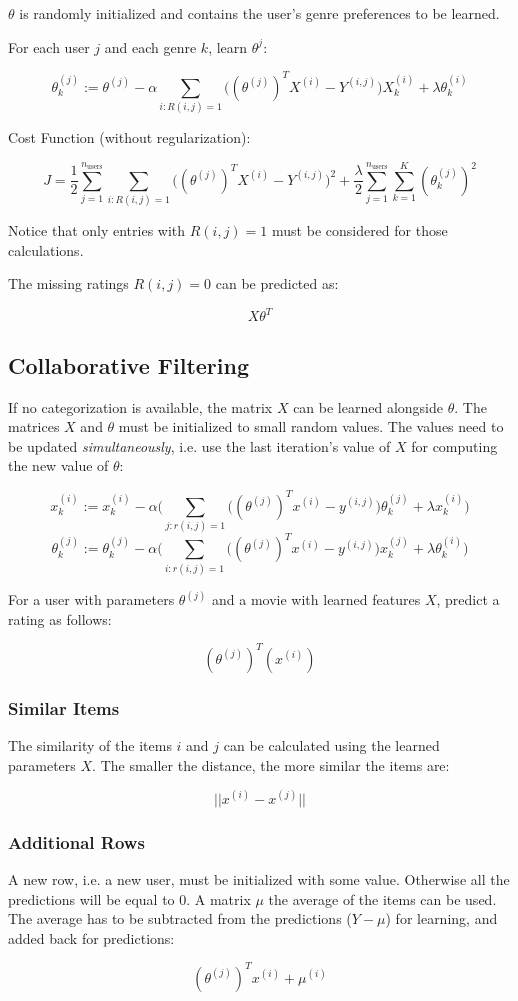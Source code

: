 \documentclass[a4paper,11pt]{scrartcl}
\begin{document}
$\theta$ is randomly initialized and contains the user's genre preferences to be learned.

For each user $j$ and each genre $k$, learn $\theta^{j}$:

$$ \theta^{(j)}_{k} := \theta^{(j)} - \alpha \sum_{i:R(i,j)=1} \Big( (\theta^{(j)})^{T}X^{(i)} - Y^{(i,j)} \Big) X_{k}^{(i)} + \lambda \theta_{k}^{(i)}$$

Cost Function (without regularization):

$$ J = \frac{1}{2} \sum_{j=1}^{n_{\text{users}}} \sum_{i:R(i,j)=1} \Big( (\theta^{(j)})^{T}X^{(i)} - Y^{(i,j)} \Big)^2 + \frac{\lambda}{2} \sum_{j=1}^{n_{\text{users}}} \sum_{k=1}^{K} (\theta_k^{(j)})^2 $$

Notice that only entries with $R(i,j)=1$ must be considered for those calculations.

The missing ratings $R(i,j)=0$ can be predicted as:

$$ X \theta^T $$

\subsection{Collaborative Filtering}

If no categorization is available, the matrix $X$ can be learned alongside $\theta$. The matrices $X$  and $\theta$ must be initialized to small random values. The values need to be updated \textit{simultaneously}, i.e. use the last iteration's value of $X$ for computing the new value of $\theta$:

$$ x_k^{(i)} := x_k^{(i)} - \alpha \Bigg( \sum_{j:r(i,j)=1} \Big( (\theta^{(j)})^T x^{(i)} - y^{(i,j)}\Big) \theta_k^{(j)} + \lambda x_k^{(i)} \Bigg) $$
$$ \theta_k^{(j)} := \theta_k^{(j)} - \alpha \Bigg( \sum_{i:r(i,j)=1} \Big( (\theta^{(j)})^T x^{(i)} - y^{(i,j)}\Big) x_k^{(j)} + \lambda \theta_k^{(i)} \Bigg) $$

For a user with parameters $\theta^{(j)}$ and a movie with learned features $X$, predict a rating as follows:

$$ (\theta^{(j)})^T (x^{(i)}) $$

\subsubsection{Similar Items}

The similarity of the items $i$ and $j$ can be calculated using the learned parameters $X$. The smaller the distance, the more similar the items are:

$$ || x^{(i)} - x^{(j)} || $$

\subsubsection{Additional Rows}

A new row, i.e. a new user, must be initialized with some value. Otherwise all the predictions will be equal to $0$. A matrix $\mu$ the average of the items can be used. The average has to be subtracted from the predictions ($Y-\mu$) for learning, and added back for predictions:

$$ (\theta^{(j)})^T x^{(i)} + \mu^{(i)} $$
\end{document}
